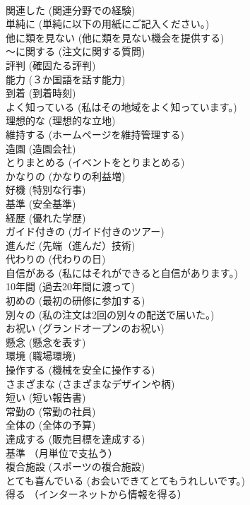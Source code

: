 \documentclass[8pt]{extreport}
\begin{document}
\begin{CJK}{UTF8}{min}
\\	関連した	(関連分野での経験)		
\\	単純に	(単純に以下の用紙にご記入ください。)		
\\	他に類を見ない	(他に類を見ない機会を提供する)		
\\	～に関する	(注文に関する質問)		
\\	評判	(確固たる評判)		
\\	能力	(３か国語を話す能力)		
\\	到着	(到着時刻)		
\\	よく知っている	(私はその地域をよく知っています。)		
\\	理想的な	(理想的な立地)		
\\	維持する	(ホームページを維持管理する)		
\\	造園	(造園会社)		
\\	とりまとめる	(イベントをとりまとめる)		
\\	かなりの	(かなりの利益増)		
\\	好機	(特別な行事)		
\\	基準	(安全基準)		
\\	経歴	(優れた学歴)		
\\	ガイド付きの	(ガイド付きのツアー)		
\\	進んだ	(先端（進んだ）技術)		
\\	代わりの	(代わりの日)		
\\	自信がある	(私にはそれができると自信があります。)		
\\	10年間	(過去20年間に渡って)		
\\	初めの	(最初の研修に参加する)		
\\	別々の	(私の注文は2回の別々の配送で届いた。)		
\\	お祝い	(グランドオープンのお祝い)		
\\	懸念	(懸念を表す)		
\\	環境	(職場環境)		
\\	操作する	(機械を安全に操作する)		
\\	さまざまな	(さまざまなデザインや柄)		
\\	短い	(短い報告書)		
\\	常勤の	(常勤の社員)		
\\	全体の	(全体の予算)		
\\	達成する	(販売目標を達成する)		
\\	基準	（月単位で支払う）		
\\	複合施設	(スポーツの複合施設)		
\\	とても喜んでいる	(お会いできてとてもうれしいです。)		
\\	得る	（インターネットから情報を得る）		

\end{CJK}
\end{document}
